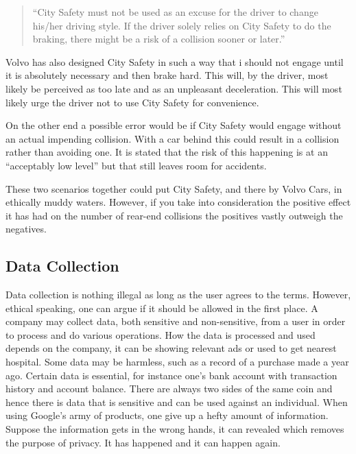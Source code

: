 \documentclass[conference]{IEEEtran}
\begin{document}
\begin{quotation}
	``City Safety must not be used as an excuse for the driver to change his/her driving style. If the driver solely relies on City Safety to do the braking, there might be a risk of a collision sooner or later.'' \cite{CitySafetyLegal}
\end{quotation}

Volvo has also designed City Safety in such a way that i should not engage until it is absolutely necessary and then brake hard. This will, by the driver, most likely be perceived as too late and as an unpleasant deceleration. This will most likely urge the driver not to use City Safety for convenience.

On the other end a possible error would be if City Safety would engage without an actual impending collision. With a car behind this could result in a collision rather than avoiding one. It is stated that the risk of this happening is at an ``acceptably low level'' \cite{SysDescription} but that still leaves room for accidents.

These two scenarios together could put City Safety, and there by Volvo Cars, in ethically muddy waters. However, if you take into consideration the positive effect it has had on the number of rear-end collisions \cite{CitySafety} the positives vastly outweigh the negatives.

\subsection{Data Collection}

Data collection is nothing illegal as long as the user agrees to the terms. However, ethical speaking, one can argue if it should be allowed in the first place. A company may collect data, both sensitive and non-sensitive, from a user in order to process and do various operations. How the data is processed and used depends on the company, it can be showing relevant ads or used to get nearest hospital. \cite{GoogleAds,GoogleNearby,GoogleUserData} Some data may be harmless, such as a record of a purchase made a year ago. Certain data is essential, for instance one's bank account with transaction history and account balance. There are always two sides of the same coin and hence there is data that is sensitive and can be used against an individual. When using Google's army of products, one give up a hefty amount of information. \cite{GoogleUserData} Suppose the information gets in the wrong hands, it can revealed which removes the purpose of privacy. It has happened and it can happen again. \cite{TheFappening,EdwardSnowden} 
\end{document}
